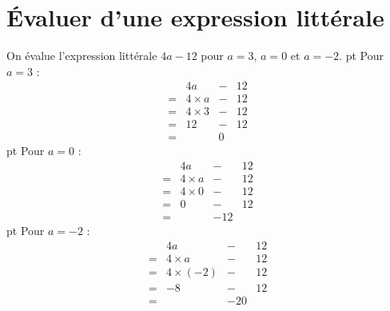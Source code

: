 \documentclass[../main.tex]{subfiles}
\begin{document}
    \part{Évaluer d'une expression littérale}
        \begin{exemple}
            On évalue l'expression littérale $4a-12$ pour $a=3$, $a=0$ et $a=-2$.
             pt
            Pour $a=3$ :
            $$\begin{array}{cccc}
                &4a&-&12\\
                =&4\times a&-&12\\
                =&4\times 3&-&12\\
                =&12&-&12\\
                =&&0&
            \end{array}$$
             pt
            Pour $a=0$ :
            $$\begin{array}{cccc}
                &4a&-&12\\
                =&4\times a&-&12\\
                =&4\times 0&-&12\\
                =&0&-&12\\
                =&&-12&
            \end{array}$$
             pt
            Pour $a=-2$ :
            $$\begin{array}{cccc}
                &4a&-&12\\
                =&4\times a&-&12\\
                =&4\times(-2)&-&12\\
                =&-8&-&12\\
                =&&-20&
            \end{array}$$
        \end{exemple}
\end{document}
